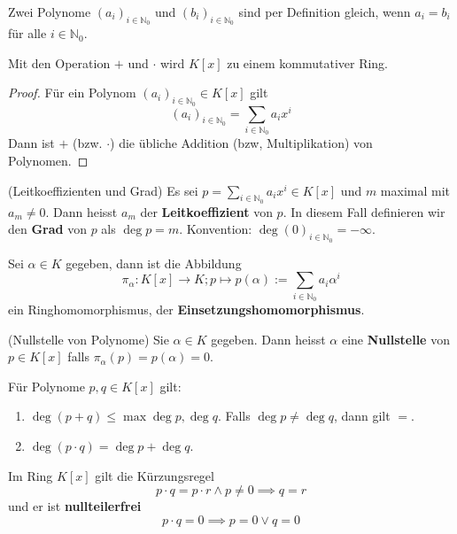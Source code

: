 \documentclass[../Algebra_script.tex]{subfiles}
\begin{document}
\begin{remark}
	Zwei Polynome $(a_i)_{i \in \mathbb{N}_0}$ und $(b_i)_{i \in \mathbb{N}_0}$ sind per Definition gleich, wenn $a_i = b_i$ für alle $i \in \mathbb{N}_0$.
\end{remark}

\begin{proposition}
	Mit den Operation $+$ und $\cdot$ wird $K[x]$ zu einem kommutativer Ring.
\end{proposition}

\begin{proof}
	Für ein Polynom $(a_i)_{i \in \mathbb{N}_0} \in K[x]$ gilt
	\[(a_i)_{i \in \mathbb{N}_0} = \sum_{i \in \mathbb{N}_0}a_i x^i\]
	Dann ist $+$ (bzw. $\cdot$) die übliche Addition (bzw, Multiplikation) von Polynomen. 
\end{proof}

\begin{definition}{(Leitkoeffizienten und Grad)}
	Es sei $p = \sum_{i \in \mathbb{N}_0} a_{i}x^{i} \in K[x]$ und $m$ maximal mit $a_m \neq 0$. Dann heisst $a_m$ der \textbf{Leitkoeffizient} von $p$. In diesem Fall definieren wir den \textbf{Grad} von $p$ als $\deg p = m$. Konvention: $\deg(0)_{i \in \mathbb{N}_0} = -\infty$.
\end{definition}

\begin{proposition}
	Sei $\alpha \in K$ gegeben, dann ist die Abbildung
	\[\pi_{\alpha}: K[x] \to K; p\mapsto p(\alpha):=\sum_{i\in\mathbb{N}_0}a_{i}\alpha^{i}\]
	ein Ringhomomorphismus, der \textbf{Einsetzungshomomorphismus}.
\end{proposition}

\begin{definition}{(Nullstelle von Polynome)}
	Sie $\alpha \in K$ gegeben. Dann heisst $\alpha$ eine \textbf{Nullstelle} von $p \in K[x]$ falls $\pi_{\alpha}(p) = p(\alpha) = 0$.
\end{definition}

\begin{proposition}
	Für Polynome $p, q \in K[x]$ gilt:
	\begin{enumerate}
		\item $\deg{(p + q)} \leq \max{\deg{p}, \deg{q}}$. Falls $\deg{p} \neq \deg{q}$, dann gilt $=$.
		\item $\deg{(p \cdot q)} = \deg{p} + \deg{q}$.
	\end{enumerate}	
\end{proposition}

\begin{corollary}
	Im Ring $K[x]$ gilt die Kürzungsregel
	\[p \cdot q = p \cdot r \wedge p \neq 0 \implies q = r\]
	und er ist \textbf{nullteilerfrei}
	\[p \cdot q = 0 \implies p = 0 \vee q = 0\]
\end{corollary}
\end{document}
